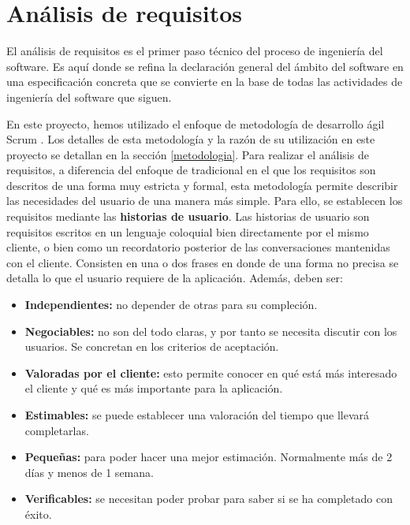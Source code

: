 
\chapter{Análisis de requisitos} \label{analisisreq}
El análisis de requisitos es el primer paso técnico del proceso de ingeniería del software. Es aquí donde se refina la declaración general del ámbito del software en una especificación concreta que se convierte en la base de todas las actividades de ingeniería del software que siguen.

En este proyecto, hemos utilizado el enfoque de metodología de desarrollo ágil Scrum \cite{libroscrum}. Los detalles de esta metodología y la razón de su utilización en este proyecto se detallan en la sección \ref{metodologia}. Para realizar el análisis de requisitos, a diferencia del enfoque de tradicional en el que los requisitos son descritos de una forma muy estricta y formal, esta metodología permite describir las necesidades del usuario de una manera más simple. Para ello, se establecen los requisitos mediante las \textbf{historias de usuario}. Las historias de usuario son requisitos escritos en un lenguaje coloquial bien directamente por el mismo cliente, o bien como un recordatorio posterior de las conversaciones mantenidas con el cliente. Consisten en una o dos frases en donde de una forma no precisa se detalla lo que el usuario requiere de la aplicación. Además, deben ser:

\begin{itemize}
\item \textbf{Independientes:} no depender de otras para su compleción.
\item \textbf{Negociables:} no son del todo claras, y por tanto se necesita discutir con los usuarios. Se concretan en los criterios de aceptación.
\item \textbf{Valoradas por el cliente:} esto permite conocer en qué está más interesado el cliente y qué es más importante para la aplicación.
\item \textbf{Estimables:} se puede establecer una valoración del tiempo que llevará completarlas.
\item \textbf{Pequeñas:} para poder hacer una mejor estimación. Normalmente más de 2 días y menos de 1 semana.
\item \textbf{Verificables:} se necesitan poder probar para saber si se ha completado con éxito. 
\end{itemize}

